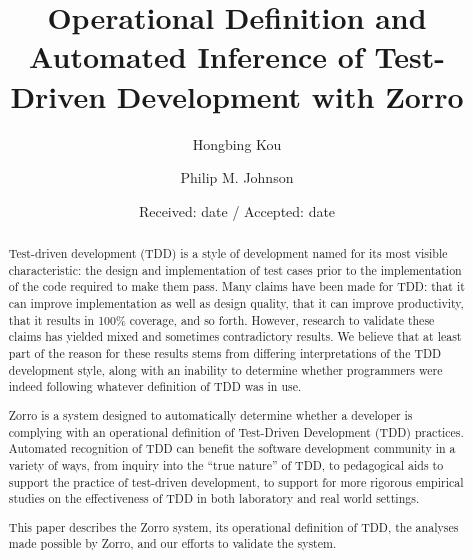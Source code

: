 \documentclass[smallextended]{svjour3}     %
\begin{document}
\title{Operational Definition and Automated Inference of Test-Driven Development with Zorro}
\author{Hongbing Kou \and Philip M. Johnson}

\date{Received: date / Accepted: date}

\maketitle

\begin{abstract}

Test-driven development (TDD) is a style of development named for its most
visible characteristic: the design and implementation of test cases prior
to the implementation of the code required to make them pass. Many claims
have been made for TDD: that it can improve implementation as well as
design quality, that it can improve productivity, that it results in 100\%
coverage, and so forth.  However, research to validate these claims has
yielded mixed and sometimes contradictory results.  We believe that at
least part of the reason for these results stems from differing
interpretations of the TDD development style, along with an inability to
determine whether programmers were indeed following whatever definition of
TDD was in use.

Zorro is a system designed to automatically determine whether a developer
is complying with an operational definition of Test-Driven Development
(TDD) practices.  Automated recognition of TDD can benefit the software
development community in a variety of ways, from inquiry into the ``true
nature'' of TDD, to pedagogical aids to support the practice of test-driven
development, to support for more rigorous empirical studies on the
effectiveness of TDD in both laboratory and real world settings.

This paper describes the Zorro system, its operational
definition of TDD, the analyses made possible by Zorro, and our 
efforts to validate the system.  

\end{abstract}
\end{document}
